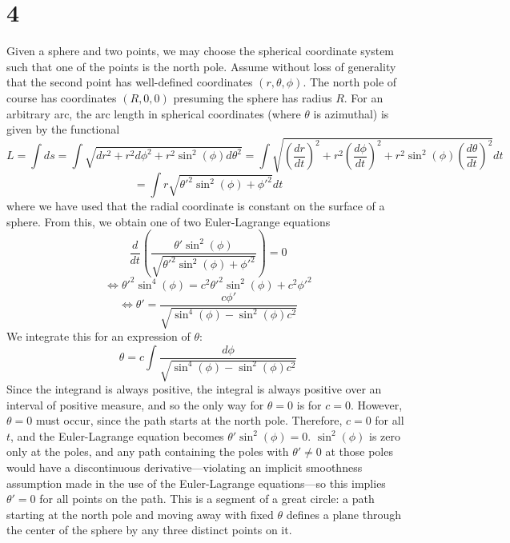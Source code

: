 \documentclass{article}
\begin{document}
\section*{4}
Given a sphere and two points, we may choose the spherical coordinate system such that one of the points is the north pole.
Assume without loss of generality that the second point has well-defined coordinates $(r,\theta,\phi)$. The north pole of course has coordinates $(R, 0, 0)$ presuming the sphere has radius $R$. For an arbitrary arc, the arc length in spherical coordinates (where $\theta$ is azimuthal)
is given by the functional
\[L=\int ds=\int\sqrt{dr^2+r^2d\phi^2+r^2\sin^2(\phi)d\theta^2}=\int\sqrt{\left( \frac{dr}{dt} \right)^2+r^2\left( \frac{d\phi}{dt} \right)^2+r^2\sin^2(\phi)\left( \frac{d\theta}{dt}\right)^2}dt\]
\[=\int r\sqrt{\theta'^2\sin^2(\phi)+\phi'^2}dt\]
where we have used that the radial coordinate is constant on the surface of a sphere.
From this, we obtain one of two Euler-Lagrange equations
\[\frac{d}{dt}\left( \frac{\theta'\sin^2(\phi)}{\sqrt{\theta'^2\sin^2(\phi)+\phi'^2}} \right) = 0\]
\[\Leftrightarrow \theta'^2\sin^4(\phi)=c^2\theta'^2\sin^2(\phi)+c^2\phi'^2\]
\[\Leftrightarrow \theta'=\frac{c\phi'}{\sqrt{\sin^4(\phi)-\sin^2(\phi)c^2}}\]
We integrate this for an expression of $\theta$:
\[\theta=c\int\frac{d\phi}{\sqrt{\sin^4(\phi)-\sin^2(\phi)c^2}}\]
Since the integrand is always positive, the integral is always positive over an interval of positive measure, and so the only way for $\theta=0$ is for $c=0$. However, $\theta = 0$ must occur, since the path starts at the north pole. Therefore, $c=0$ for all $t$, and the Euler-Lagrange equation becomes $\theta'\sin^2(\phi)=0$. $\sin^2(\phi)$ is zero only at the poles, and any path containing the poles with $\theta'\neq 0$ at those poles would have a discontinuous derivative---violating an implicit smoothness assumption made in the use of the Euler-Lagrange equations---so this implies $\theta'=0$ for all points on the path. This is a segment of a great circle: a path starting at the north pole and moving away with fixed $\theta$ defines a plane through the center of the sphere by any three distinct points on it.
\end{document}

